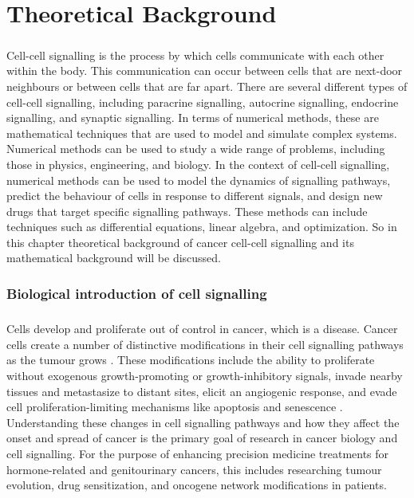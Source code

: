 \chapter{Theoretical Background}
\label{chap:02}
\paragraph{}
Cell-cell signalling is the process by which cells communicate with each other within the body. This communication can occur between cells that are next-door neighbours or between cells that are far apart. There are several different types of cell-cell signalling, including paracrine signalling, autocrine signalling, endocrine signalling, and synaptic signalling. In terms of numerical methods, these are mathematical techniques that are used to model and simulate complex systems. Numerical methods can be used to study a wide range of problems, including those in physics, engineering, and biology. In the context of cell-cell signalling, numerical methods can be used to model the dynamics of signalling pathways, predict the behaviour of cells in response to different signals, and design new drugs that target specific signalling pathways. These methods can include techniques such as differential equations, linear algebra, and optimization. So in this chapter theoretical background of cancer cell-cell signalling and its mathematical background will be discussed. 

\subsection{Biological introduction of cell signalling}
\paragraph{}
Cells develop and proliferate out of control in cancer, which is a disease. Cancer cells create a number of distinctive modifications in their cell signalling pathways as the tumour grows \cite{peng2017lncrna}. These modifications include the ability to proliferate without exogenous growth-promoting or growth-inhibitory signals, invade nearby tissues and metastasize to distant sites, elicit an angiogenic response, and evade cell proliferation-limiting mechanisms like apoptosis and senescence \cite{crosas2022rho}. Understanding these changes in cell signalling pathways and how they affect the onset and spread of cancer is the primary goal of research in cancer biology and cell signalling. For the purpose of enhancing precision medicine treatments for hormone-related and genitourinary cancers, this includes researching tumour evolution, drug sensitization, and oncogene network modifications in patients. 

